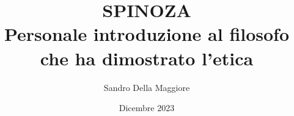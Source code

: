 \documentclass[a4paper,12pt,oneside,openany]{book}%
\begin{document}
	\author{Sandro Della Maggiore}
	\title{\Huge SPINOZA\\{\Large Personale introduzione al filosofo che ha dimostrato l'etica}}
	\date{Dicembre 2023}
	\maketitle
		
	
		
	
	
	
	
	
	

	
\end{document}
